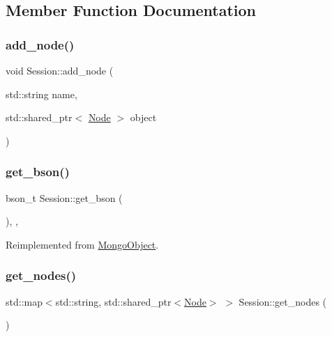\subsection{Member Function Documentation}
\mbox{\label{class_session_a7b5d3b9db809cc54e515639b78b0e811}} 
\subsubsection{\texorpdfstring{add\+\_\+node()}{add\_node()}}
{\footnotesize\ttfamily void Session\+::add\+\_\+node (\begin{DoxyParamCaption}\item[{std\+::string}]{name,  }\item[{std\+::shared\+\_\+ptr$<$ \hyperlink{class_node}{Node} $>$}]{object }\end{DoxyParamCaption})\hspace{0.3cm}{\ttfamily [inline]}}

\mbox{\label{class_session_aa517fe6138a0cc32e27ddf1eb7331520}} 
\subsubsection{\texorpdfstring{get\+\_\+bson()}{get\_bson()}}
{\footnotesize\ttfamily bson\+\_\+t Session\+::get\+\_\+bson (\begin{DoxyParamCaption}{ }\end{DoxyParamCaption})\hspace{0.3cm}{\ttfamily [final]}, {\ttfamily [protected]}, {\ttfamily [virtual]}}



Reimplemented from \hyperlink{class_mongo_object_ac21cbe104a818f7e6ee7dcfbb521e9e1}{Mongo\+Object}.

\mbox{\label{class_session_af091cae3db4abcc5afe4a8abaef222f2}} 
\subsubsection{\texorpdfstring{get\+\_\+nodes()}{get\_nodes()}}
{\footnotesize\ttfamily std\+::map$<$std\+::string, std\+::shared\+\_\+ptr$<$\hyperlink{class_node}{Node}$>$ $>$ Session\+::get\+\_\+nodes (\begin{DoxyParamCaption}{ }\end{DoxyParamCaption})\hspace{0.3cm}{\ttfamily [inline]}}

